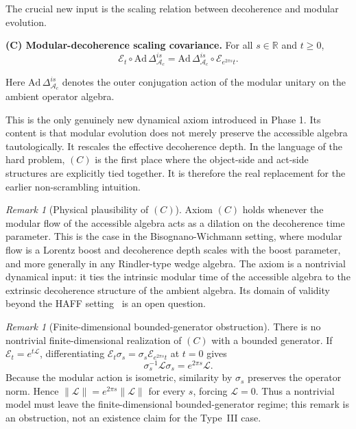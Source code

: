 \documentclass[12pt]{article}
\theoremstyle{definition}
\theoremstyle{remark}
\newtheorem{remark}[theorem]{Remark}
\begin{document}
The crucial new input is the scaling relation between decoherence and
modular evolution.

\textbf{(C) Modular-decoherence scaling covariance.}
For all \(s\in\mathbb{R}\) and \(t\ge 0\), \[
\mathcal{E}_t\circ \mathrm{Ad}\,\Delta_{\mathcal{A}_c}^{is}
=
\mathrm{Ad}\,\Delta_{\mathcal{A}_c}^{is}\circ \mathcal{E}_{e^{2\pi s}t}.
\]

Here \(\mathrm{Ad}\,\Delta_{\mathcal{A}_c}^{is}\) denotes the outer
conjugation action of the modular unitary on the ambient operator
algebra.

This is the only genuinely new dynamical axiom introduced in Phase 1.
Its content is that modular evolution does not merely preserve the
accessible algebra tautologically. It rescales the effective decoherence
depth. In the language of the hard problem, \((C)\) is the first place
where the object-side and act-side structures are explicitly tied
together. It is therefore the real replacement for the earlier
non-scrambling intuition.

\begin{remark}[Physical plausibility of \((C)\)]
Axiom \((C)\) holds whenever the modular flow of the accessible algebra
acts as a dilation on the decoherence time parameter. This is the case
in the Bisognano-Wichmann setting, where modular flow is a Lorentz
boost and decoherence depth scales with the boost parameter, and more
generally in any Rindler-type wedge algebra. The axiom is a nontrivial
dynamical input: it ties the intrinsic modular time of the accessible
algebra to the extrinsic decoherence structure of the ambient algebra.
Its domain of validity beyond the HAFF setting~\cite{Liu2026PaperD} is
an open question.
\end{remark}

\begin{remark}[Finite-dimensional bounded-generator obstruction]
There is no nontrivial finite-dimensional realization of \((C)\) with a
bounded generator. If
\(\mathcal{E}_t=e^{t\mathcal{L}}\), differentiating
\(\mathcal{E}_t\sigma_s=\sigma_s\mathcal{E}_{e^{2\pi s}t}\) at
\(t=0\) gives
\[
\sigma_s^{-1}\mathcal{L}\sigma_s=e^{2\pi s}\mathcal{L}.
\]
Because the modular action is isometric, similarity by \(\sigma_s\)
preserves the operator norm. Hence
\(\|\mathcal{L}\|=e^{2\pi s}\|\mathcal{L}\|\) for every \(s\), forcing
\(\mathcal{L}=0\). Thus a nontrivial model must leave the
finite-dimensional bounded-generator regime; this remark is an
obstruction, not an existence claim for the Type~III case.
\end{remark}
\end{document}
